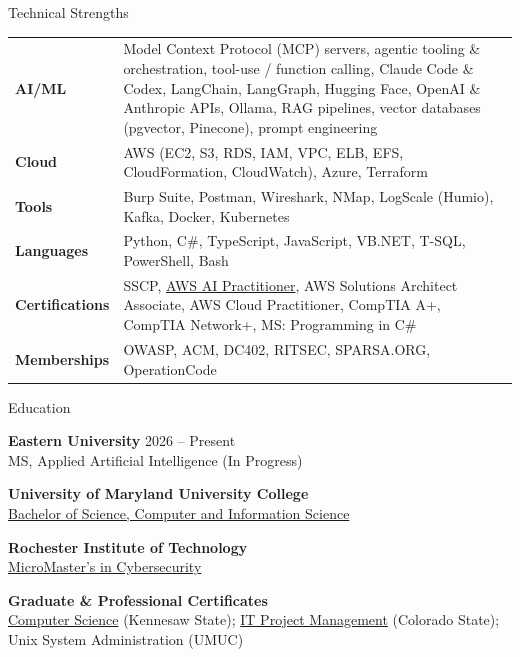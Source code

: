 \documentclass{resume} %
\begin{document}
\begin{rSection}{Technical Strengths}

\begin{tabular}{ @{} >{\bfseries}l @{\hspace{6ex}} p{4.5in} }
AI/ML & Model Context Protocol (MCP) servers, agentic tooling \& orchestration, tool-use / function calling, Claude Code \& Codex, LangChain, LangGraph, Hugging Face, OpenAI \& Anthropic APIs, Ollama, RAG pipelines, vector databases (pgvector, Pinecone), prompt engineering\\
Cloud & AWS (EC2, S3, RDS, IAM, VPC, ELB, EFS, CloudFormation, CloudWatch), Azure, Terraform\\
Tools & Burp Suite, Postman, Wireshark, NMap, LogScale (Humio), Kafka, Docker, Kubernetes\\
Languages & Python, C\#, TypeScript, JavaScript, VB.NET, T-SQL, PowerShell, Bash\\
Certifications & SSCP, \href{https://www.credly.com/badges/6eda0d26-3542-4f75-b1e5-6d481e701bf1}{AWS AI Practitioner}, AWS Solutions Architect Associate, AWS Cloud Practitioner, CompTIA A+, CompTIA Network+, MS: Programming in C\#\\
Memberships & OWASP, ACM, DC402, RITSEC, SPARSA.ORG, OperationCode
\end{tabular}

\end{rSection}



\begin{rSection}{Education}

{\bf Eastern University} \hfill {2026 -- Present} \\
MS, Applied Artificial Intelligence (In Progress)

{\bf University of Maryland University College} \\
\href{https://github.com/CryptoJones/cv/raw/master/UMUC_UNDERGRAD_DIPLOMA.jpg}{Bachelor of Science, Computer and Information Science}

{\bf Rochester Institute of Technology} \\
\href{https://raw.githubusercontent.com/CryptoJones/cv/master/RIT_MMM.pdf}{MicroMaster's in Cybersecurity}

{\bf Graduate \& Professional Certificates} \\
\href{https://raw.githubusercontent.com/CryptoJones/cv/master/KSU_GRADCERT_CSF.jpg}{Computer Science} (Kennesaw State); \href{https://raw.githubusercontent.com/CryptoJones/cv/master/CSU_GRADCERT_ITPM.jpg}{IT Project Management} (Colorado State); Unix System Administration (UMUC)

\end{rSection}
\end{document}
